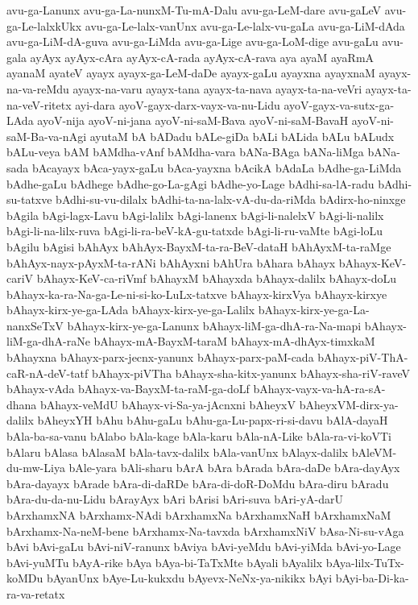 {avu-ga-Lanunx
avu-ga-La-nunxM-Tu-mA-Dalu
avu-ga-LeM-dare
avu-gaLeV
avu-ga-Le-lalxkUkx
avu-ga-Le-lalx-vanUnx
avu-ga-Le-lalx-vu-gaLa
avu-ga-LiM-dAda
avu-ga-LiM-dA-guva
avu-ga-LiMda
avu-ga-Lige
avu-ga-LoM-dige
avu-gaLu
avu-gala
ayAyx
ayAyx-cAra
ayAyx-cA-rada
ayAyx-cA-rava
aya
ayaM
ayaRmA
ayanaM
ayateV
ayayx
ayayx-ga-LeM-daDe
ayayx-gaLu
ayayxna
ayayxnaM
ayayx-na-va-reMdu
ayayx-na-varu
ayayx-tana
ayayx-ta-nava
ayayx-ta-na-veVri
ayayx-ta-na-veV-ritetx
ayi-dara
ayoV-gayx-darx-vayx-va-nu-Lidu
ayoV-gayx-va-sutx-ga-LAda
ayoV-nija
ayoV-ni-jana
ayoV-ni-saM-Bava
ayoV-ni-saM-BavaH
ayoV-ni-saM-Ba-va-nAgi
ayutaM
bA
bADadu
bALe-giDa
bALi
bALida
bALu
bALudx
bALu-veya
bAM
bAMdha-vAnf
bAMdha-vara
bANa-BAga
bANa-liMga
bANa-sada
bAcayayx
bAca-yayx-gaLu
bAca-yayxna
bAcikA
bAdaLa
bAdhe-ga-LiMda
bAdhe-gaLu
bAdhege
bAdhe-go-La-gAgi
bAdhe-yo-Lage
bAdhi-sa-lA-radu
bAdhi-su-tatxve
bAdhi-su-vu-dilalx
bAdhi-ta-na-lalx-vA-du-da-riMda
bAdirx-ho-ninxge
bAgila
bAgi-lagx-Lavu
bAgi-lalilx
bAgi-lanenx
bAgi-li-nalelxV
bAgi-li-nalilx
bAgi-li-na-lilx-ruva
bAgi-li-ra-beV-kA-gu-tatxde
bAgi-li-ru-vaMte
bAgi-loLu
bAgilu
bAgisi
bAhAyx
bAhAyx-BayxM-ta-ra-BeV-dataH
bAhAyxM-ta-raMge
bAhAyx-nayx-pAyxM-ta-rANi
bAhAyxni
bAhUra
bAhara
bAhayx
bAhayx-KeV-cariV
bAhayx-KeV-ca-riVmf
bAhayxM
bAhayxda
bAhayx-dalilx
bAhayx-doLu
bAhayx-ka-ra-Na-ga-Le-ni-si-ko-LuLx-tatxve
bAhayx-kirxVya
bAhayx-kirxye
bAhayx-kirx-ye-ga-LAda
bAhayx-kirx-ye-ga-Lalilx
bAhayx-kirx-ye-ga-La-nanxSeTxV
bAhayx-kirx-ye-ga-Lanunx
bAhayx-liM-ga-dhA-ra-Na-mapi
bAhayx-liM-ga-dhA-raNe
bAhayx-mA-BayxM-taraM
bAhayx-mA-dhAyx-timxkaM
bAhayxna
bAhayx-parx-jecnx-yanunx
bAhayx-parx-paM-cada
bAhayx-piV-ThA-caR-nA-deV-tatf
bAhayx-piVTha
bAhayx-sha-kitx-yanunx
bAhayx-sha-riV-raveV
bAhayx-vAda
bAhayx-va-BayxM-ta-raM-ga-doLf
bAhayx-vayx-va-hA-ra-sA-dhana
bAhayx-veMdU
bAhayx-vi-Sa-ya-jAcnxni
bAheyxV
bAheyxVM-dirx-ya-dalilx
bAheyxYH
bAhu
bAhu-gaLu
bAhu-ga-Lu-papx-ri-si-davu
bAlA-dayaH
bAla-ba-sa-vanu
bAlabo
bAla-kage
bAla-karu
bAla-nA-Like
bAla-ra-vi-koVTi
bAlaru
bAlasa
bAlasaM
bAla-tavx-dalilx
bAla-vanUnx
bAlayx-dalilx
bAleVM-du-mw-Liya
bAle-yara
bAli-sharu
bArA
bAra
bArada
bAra-daDe
bAra-dayAyx
bAra-dayayx
bArade
bAra-di-daRDe
bAra-di-doR-DoMdu
bAra-diru
bAradu
bAra-du-da-nu-Lidu
bArayAyx
bAri
bArisi
bAri-suva
bAri-yA-darU
bArxhamxNA
bArxhamx-NAdi
bArxhamxNa
bArxhamxNaH
bArxhamxNaM
bArxhamx-Na-neM-bene
bArxhamx-Na-tavxda
bArxhamxNiV
bAsa-Ni-su-vAga
bAvi
bAvi-gaLu
bAvi-niV-ranunx
bAviya
bAvi-yeMdu
bAvi-yiMda
bAvi-yo-Lage
bAvi-yuMTu
bAyA-rike
bAya
bAya-bi-TaTxMte
bAyali
bAyalilx
bAya-lilx-TuTx-koMDu
bAyanUnx
bAye-Lu-kukxdu
bAyevx-NeNx-ya-nikikx
bAyi
bAyi-ba-Di-ka-ra-va-retatx
}
